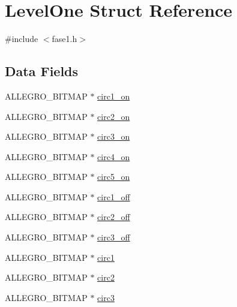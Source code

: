 \hypertarget{struct_level_one}{\section{Level\-One Struct Reference}
\label{struct_level_one}
}


{\ttfamily \#include $<$fase1.\-h$>$}

\subsection*{Data Fields}
\begin{DoxyCompactItemize}
\item 
A\-L\-L\-E\-G\-R\-O\-\_\-\-B\-I\-T\-M\-A\-P $\ast$ \hyperlink{struct_level_one_a15699608afb18fad793848cd8fd32fe0}{circ1\-\_\-on}
\item 
A\-L\-L\-E\-G\-R\-O\-\_\-\-B\-I\-T\-M\-A\-P $\ast$ \hyperlink{struct_level_one_aa582b8f9acdbb85a2d1d54705e26fa15}{circ2\-\_\-on}
\item 
A\-L\-L\-E\-G\-R\-O\-\_\-\-B\-I\-T\-M\-A\-P $\ast$ \hyperlink{struct_level_one_ad58139cfabe6836662aec8a3293c9208}{circ3\-\_\-on}
\item 
A\-L\-L\-E\-G\-R\-O\-\_\-\-B\-I\-T\-M\-A\-P $\ast$ \hyperlink{struct_level_one_ae514d3cf3c3cb83de5ab4682ead1c7f6}{circ4\-\_\-on}
\item 
A\-L\-L\-E\-G\-R\-O\-\_\-\-B\-I\-T\-M\-A\-P $\ast$ \hyperlink{struct_level_one_a1537bde5184cc347504f101c712fb0ee}{circ5\-\_\-on}
\item 
A\-L\-L\-E\-G\-R\-O\-\_\-\-B\-I\-T\-M\-A\-P $\ast$ \hyperlink{struct_level_one_a61973bafd11ab9dea9306731297f4728}{circ1\-\_\-off}
\item 
A\-L\-L\-E\-G\-R\-O\-\_\-\-B\-I\-T\-M\-A\-P $\ast$ \hyperlink{struct_level_one_a384448f3d672f70b70b1bf454cb46e50}{circ2\-\_\-off}
\item 
A\-L\-L\-E\-G\-R\-O\-\_\-\-B\-I\-T\-M\-A\-P $\ast$ \hyperlink{struct_level_one_a91273d7098df87dd93c9f9a10b62ed08}{circ3\-\_\-off}
\item 
A\-L\-L\-E\-G\-R\-O\-\_\-\-B\-I\-T\-M\-A\-P $\ast$ \hyperlink{struct_level_one_a9877f31790b6d2f38fb468a9448223f1}{circ1}
\item 
A\-L\-L\-E\-G\-R\-O\-\_\-\-B\-I\-T\-M\-A\-P $\ast$ \hyperlink{struct_level_one_a1b8836cb8a00a286c87bfbafdacbd03d}{circ2}
\item 
A\-L\-L\-E\-G\-R\-O\-\_\-\-B\-I\-T\-M\-A\-P $\ast$ \hyperlink{struct_level_one_aaa21201ceebf455212233414bd6eedbc}{circ3}
\item 

\end{DoxyCompactItemize}
